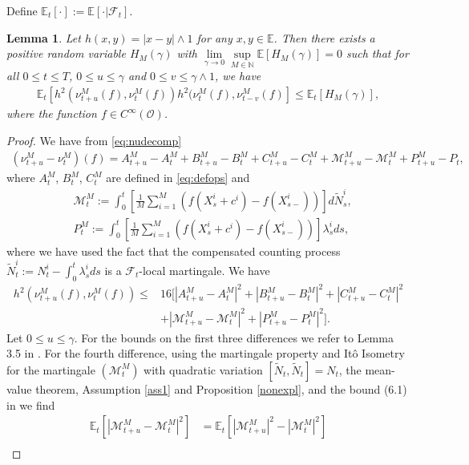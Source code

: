 \documentclass[10pt]{article}
\theoremstyle{plain}
\newtheorem{lemma}[theorem]{Lemma}                              %
\theoremstyle{definition}
\newcommand{\<}{\langle}
\renewcommand{\>}{\rangle}
\renewcommand{\(}{\left(}
\renewcommand{\)}{\right)}
\renewcommand{\[}{\left[}
\renewcommand{\]}{\right]}
\newcommand{\blu}[1]{\textcolor{blue}{#1}}
\begin{document}
Define $\mathbb{E}_t[\cdot]:=\mathbb{E}[\cdot|\mathcal{F}_t]$.
\begin{lemma}\label{rc2}
Let $h(x,y)=|x-y|\wedge 1$ for any $x,y\in\mathbb{E}$. Then there exists a positive random
variable $H_M(\gamma)$ with $\lim\limits_{\gamma\rightarrow
0}\sup\limits_{M\in\mathbb{N}}\mathbb{E}[H_M(\gamma)]=0$ such that for all $0\leq t\leq T$, $0\leq
u\leq \gamma$ and $0\leq v\leq \gamma\wedge 1$, we have
\begin{align}
\mathbb{E}_t\left[h^2(\nu_{t+u}^M(f),\nu_t^M(f))h^2(\nu_t^M(f),\nu_{t-v}^M(f)\right]\leq \mathbb{E}_t[H_M(\gamma)],
\end{align}
where the function $f\in C^{\infty}(\mathcal{O})$.
\end{lemma}
\begin{proof}
We have from \eqref{eq:nudecomp}
\begin{align}
(\nu_{t+u}^M-\nu_t^M)(f) = A_{t+u}^M-A_t^M+B_{t+u}^M-B_t^M+C_{t+u}^M-C_t^M + \mathcal{M}_{t+u}^M-\mathcal{M}_t^M+P_{t+u}^M-P_t,
\end{align}
where $A_t^M$, $B_t^M$, $C_t^M$ are defined in \eqref{eq:defops} and
\begin{align}
&\mathcal{M}_t^M:=\int_0^t\left[\frac{1}{M}\sum\limits_{i=1}^M(f(X_s^i+c^i)-f(X_{s-}^i))\right]d\tilde
N_s^i,\\
&P_t^M:=\int_0^t\left[\frac{1}{M}\sum\limits_{i=1}^M(f(X_s^i+c^i)-f(X_{s-}^i))\right]\lambda_s^ids,
\end{align}
where we have used the fact that the compensated counting process $\tilde N_t^i:= N_t^i-\int_0^t\lambda^i_sds$ is a $\mathcal{F}_t$-local martingale. We have
\begin{align}
h^2\left(\nu_{t+u}^M(f),\nu_t^M(f)\right)\leq& 16\big[\left|A_{t+u}^M-A_t^M\right|^2+\left|B_{t+u}^M-B_t^M\right|^2+\left|C_{t+u}^M-C_t^M\right|^2\\
&+\left|\mathcal{M}_{t+u}^M-\mathcal{M}_t^M\right|^2+\left|P_{t+u}^M-P_t^M\right|^2\big].
\end{align}
Let $0\leq u\leq \gamma$. For the bounds on the first three differences we refer to Lemma 3.5 in \citet{capponi15}. For the fourth difference, using the martingale property and It\^o Isometry for the martingale $(\mathcal{M}_t^M)$ with quadratic variation $[\tilde N_t,\tilde N_t]=N_t$, %
 the mean-value theorem, Assumption \ref{ass1} and Proposition \ref{nonexpl}, and the bound (6.1) in \citet{giesecke13} we find
\begin{align}
\mathbb{E}_t\left[\left|\mathcal{M}_{t+u}^M-\mathcal{M}_t^M\right|^2\right]&=\mathbb{E}_t\left[\left|\mathcal{M}_{t+u}^M\right|^2-\left|\mathcal{M}_t^M\right|^2\right]\\

\end{align}
\end{proof}
\end{document}
